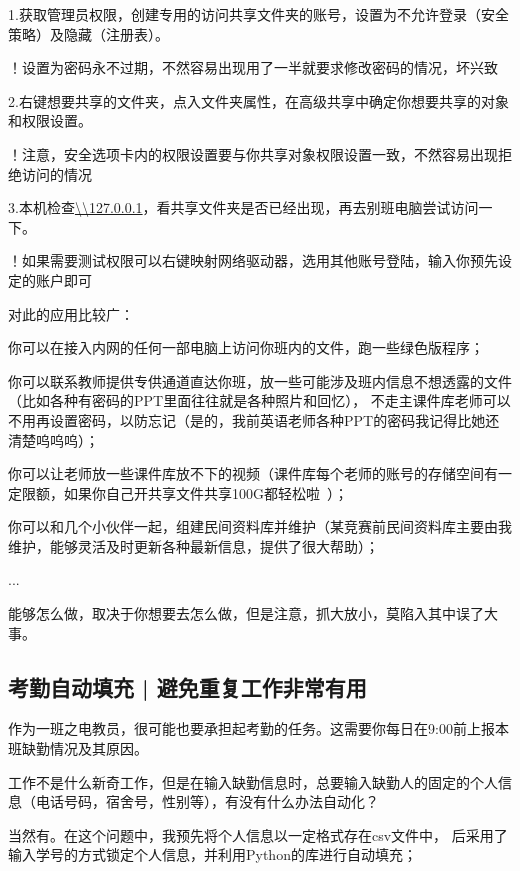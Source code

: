 \documentclass[a5paper]{article}
\begin{document}
        1.获取管理员权限，创建专用的访问共享文件夹的账号，设置为不允许登录（安全策略）及隐藏（注册表）。
        
        ！设置为密码永不过期，不然容易出现用了一半就要求修改密码的情况，坏兴致
        
        2.右键想要共享的文件夹，点入文件夹属性，在高级共享中确定你想要共享的对象和权限设置。
        
        ！注意，安全选项卡内的权限设置要与你共享对象权限设置一致，不然容易出现拒绝访问的情况

        3.本机检查\url{\\127.0.0.1}，看共享文件夹是否已经出现，再去别班电脑尝试访问一下。
        
        ！如果需要测试权限可以右键映射网络驱动器，选用其他账号登陆，输入你预先设定的账户即可

        对此的应用比较广：
        
        你可以在接入内网的任何一部电脑上访问你班内的文件，跑一些绿色版程序；

        你可以联系教师提供专供通道直达你班，放一些可能涉及班内信息不想透露的文件（比如各种有密码的PPT里面往往就是各种照片和回忆），
        不走主课件库老师可以不用再设置密码，以防忘记（是的，我前英语老师各种PPT的密码我记得比她还清楚呜呜呜）；
        
        你可以让老师放一些课件库放不下的视频（课件库每个老师的账号的存储空间有一定限额，如果你自己开共享文件共享100G都轻松啦~）；

        你可以和几个小伙伴一起，组建民间资料库并维护（某竞赛前民间资料库主要由我维护，能够灵活及时更新各种最新信息，提供了很大帮助）；

        ...

        能够怎么做，取决于你想要去怎么做，但是注意，抓大放小，莫陷入其中误了大事。

        \subsection{考勤自动填充 | 避免重复工作非常有用}

        作为一班之电教员，很可能也要承担起考勤的任务。这需要你每日在9:00前上报本班缺勤情况及其原因。

        工作不是什么新奇工作，但是在输入缺勤信息时，总要输入缺勤人的固定的个人信息（电话号码，宿舍号，性别等），有没有什么办法自动化？

        当然有。在这个问题中，我预先将个人信息以一定格式存在csv文件中，
        后采用了输入学号的方式锁定个人信息，并利用Python的库进行自动填充；
\end{document}
